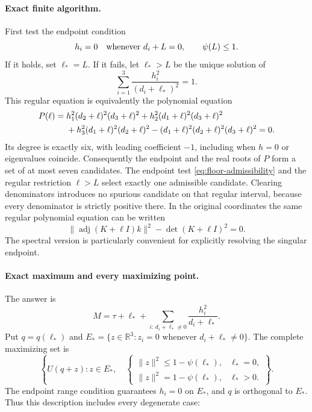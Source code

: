 \paragraph{Exact finite algorithm.}
First test the endpoint condition
\begin{equation}
 h_i=0\quad\hbox{whenever }d_i+L=0,
 \qquad \psi(L)\leq1.
 \label{eq:floor-admissibility}
\end{equation}
If it holds, set $\ell_*=L$.  If it fails, let $\ell_*>L$ be the unique solution of
\begin{equation}
 \sum_{i=1}^3\frac{h_i^2}{(d_i+\ell_*)^2}=1.
 \label{eq:regular-secular}
\end{equation}
This regular equation is equivalently the polynomial equation
\begin{align}
 P(\ell)={}&h_1^2(d_2+\ell)^2(d_3+\ell)^2
 +h_2^2(d_1+\ell)^2(d_3+\ell)^2\notag\\
 &+h_3^2(d_1+\ell)^2(d_2+\ell)^2
 -(d_1+\ell)^2(d_2+\ell)^2(d_3+\ell)^2=0.
 \label{eq:secular-polynomial}
\end{align}
Its degree is exactly six, with leading coefficient $-1$, including when
$h=0$ or eigenvalues coincide.  Consequently the endpoint and the real roots
of $P$ form a set of at most seven candidates.  The endpoint test
\eqref{eq:floor-admissibility} and the regular restriction $\ell>L$ select
exactly one admissible candidate.  Clearing denominators introduces no
spurious candidate on that regular interval, because every denominator is
strictly positive there.  In the original coordinates the same regular
polynomial equation can be written
\[
 \|\operatorname{adj}(K+\ell I)k\|^2-\det(K+\ell I)^2=0.
\]
The spectral version is particularly convenient for explicitly resolving the
singular endpoint.

\paragraph{Exact maximum and every maximizing point.}
The answer is
\begin{equation}
 M=\tau+\ell_*+
 \sum_{i:\,d_i+\ell_*\ne0}\frac{h_i^2}{d_i+\ell_*}.
 \label{eq:complete-orbit-value}
\end{equation}
Put $q=q(\ell_*)$ and
$E_* = \{z\in\mathbb R^3:z_i=0\text{ whenever }d_i+\ell_*\ne0\}$.
The complete maximizing set is
\begin{equation}
 \left\{U(q+z):z\in E_*,\quad
 \begin{cases}
  \|z\|^2\leq1-\psi(\ell_*),&\ell_*=0,\\
  \|z\|^2=1-\psi(\ell_*),&\ell_*>0.
 \end{cases}\right\}.
 \label{eq:complete-orbit-maximizers}
\end{equation}
The endpoint range condition guarantees $h_i=0$ on $E_*$, and $q$ is
orthogonal to $E_*$.  Thus this description includes every degenerate case:


